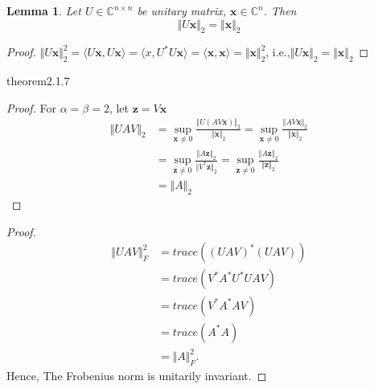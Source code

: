 \documentclass[12pt]{article}
\newtheorem{lemma}{Lemma}
\begin{document}
\begin{lemma}
    Let $U\in \mathbb{C}^{n\times n}$ be unitary matrix, $\mathbf{x}\in \mathbb{C}^n$. Then
    \[\Vert U\mathbf{x} \Vert_2=\Vert \mathbf{x} \Vert_2\]
\end{lemma}

\begin{proof}
     $\Vert U\mathbf{x} \Vert_2^2=\langle U\mathbf{x},U\mathbf{x}\rangle=\langle x,U^*U\mathbf{x}\rangle=\langle \mathbf{x},\mathbf{x}\rangle=\Vert \mathbf{x} \Vert_2^2$, i.e.,$\Vert U\mathbf{x} \Vert_2=\Vert \mathbf{x} \Vert_2$
\end{proof}

theorem2.1.7
\begin{proof}
    For $\alpha =\beta =2$, let $\mathbf{z}=V\mathbf{x}$
    \begin{align*}
        \Vert UAV \Vert_2
        &=\sup_{\mathbf{x}\neq 0}{\frac{\Vert U(AV\mathbf{x}) \Vert_2}{\Vert \mathbf{x} \Vert_2}}=\sup_{\mathbf{x}\neq 0}{\frac{\Vert AV\mathbf{x} \Vert_2}{\Vert \mathbf{x} \Vert_2}}\\
        &=\sup_{\mathbf{z}\neq 0}{\frac{\Vert A\mathbf{z} \Vert_2}{\Vert V^*\mathbf{z} \Vert_2}}=\sup_{\mathbf{z}\neq 0}{\frac{\Vert A\mathbf{z} \Vert_2}{\Vert \mathbf{z} \Vert_2}}\\
        &=\Vert A \Vert_2
    \end{align*}
\end{proof}

\begin{proof}
    \begin{align*}
        \Vert UAV\Vert_F^2
        &=trace((UAV)^*(UAV))\\
        &=trace(V^*A^*U^*UAV)\\
        &=trace(V^*A^*AV)\\
        &=trace(A^*A)\\
        &=\Vert A\Vert_F^2.
    \end{align*}
    Hence, The Frobenius norm is unitarily invariant.
\end{proof}
\end{document}
